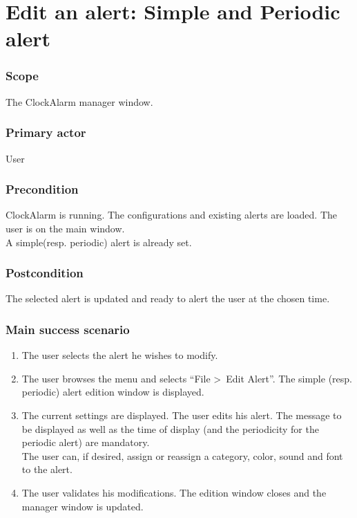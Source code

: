 \section{Edit an alert: Simple and Periodic alert}\label{subsec:usecase_edit_simple_alert}

\subsubsection{Scope}
The ClockAlarm manager window.
\subsubsection{Primary actor}
User
\subsubsection{Precondition}
ClockAlarm is running. The configurations and existing alerts are loaded. The user is on the main window.
\\A simple(resp. periodic) alert is already set.
\subsubsection{Postcondition}
The selected alert is updated and ready to alert the user at the chosen time.
\subsubsection{Main success scenario}
\begin{enumerate}
	\item The user selects the alert he wishes to modify.
	\item \label{itm:ucae_edit_spa} The user browses the menu and selects ``File \textgreater~Edit Alert''. The simple (resp. periodic) alert edition window is displayed. 
	\item \label{itm:ucae_enter_spa} The current settings are displayed. The user edits his alert. The message to be displayed as well as the time of display (and the periodicity for the periodic alert) are mandatory. \\The user can, if desired, assign or reassign a category, color, sound and font to the alert.
	\item \label{itm:ucae_validate_spa} The user validates his modifications. The edition window closes and the manager window is updated.
\end{enumerate}
